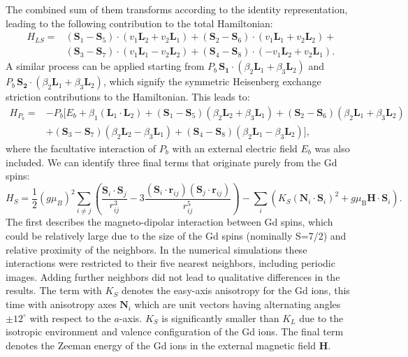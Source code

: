 The combined sum of them transforms according to the identity representation, leading to the following contribution to the total Hamiltonian:
\begin{align}
    H_{LS} =& (\bm{S}_1 - \bm{S}_5) \cdot (v_1 \bm{L}_2 + v_2 \bm{L}_1) + (\bm{S}_2 - \bm{S}_6) \cdot (v_1 \bm{L}_1 + v_2 \bm{L}_2) + \nonumber \\ &(\bm{S}_3 - \bm{S}_7) \cdot (v_1 \bm{L}_1 - v_2 \bm{L}_2) + (\bm{S}_4 - \bm{S}_8) \cdot (-v_1 \bm{L}_2 + v_2 \bm{L}_1).
\end{align}
A similar process can be applied starting from $P_b \, \bm{S_1}\cdot(\beta_2 \bm{L}_1 + \beta_3 \bm{L}_2)$ and $P_b\, \bm{S_2}\cdot(\beta_2 \bm{L}_1 + \beta_3 \bm{L}_2)$, which signify the symmetric Heisenberg exchange striction contributions to the Hamiltonian. This leads to:
\begin{align}
	H_{P_b}=&-P_b[E_b + \beta_1 (\bm{L}_1\cdot \bm{L}_2)+
    (\bm{S}_1-\bm{S}_5)(\beta_2 \bm{L}_2 + \beta_3 \bm{L}_1) +
    (\bm{S}_2-\bm{S}_6)(\beta_2 \bm{L}_1 + \beta_3 \bm{L}_2) \nonumber\\ 
    &+(\bm{S}_3-\bm{S}_7)(\beta_2 \bm{L}_2 - \beta_3 \bm{L}_1) +
    (\bm{S}_4-\bm{S}_8)(\beta_2 \bm{L}_1 - \beta_3 \bm{L}_2)],
\end{align}
where the facultative interaction of $P_b$ with an external electric field $E_b$ was also included. 
We can identify three final terms that originate purely from the Gd spins:
\begin{equation}
     H_S=\frac{1}{2}(g \mu_B)^2\sum_{i\neq j}\left(\frac{\bm{S}_i\cdot \bm{S}_j}{r_{ij}^3}-3\frac{(\bm{S}_i\cdot \bm{r}_{ij})(\bm{S}_j\cdot \bm{r}_{ij})}{r_{ij}^5}\right) - \sum_i\left( K_S(\bm{N}_i\cdot \bm{S}_i)^2 + g\mu_\mathrm{B} \bm{H} \cdot \bm{S}_i\right). 
\end{equation}
The first describes the magneto-dipolar interaction between Gd spins, which could be relatively large due to the size of the Gd spins (nominally S=7/2) and relative proximity of the neighbors.
In the numerical simulations these interactions were restricted to their five nearest neighbors, including periodic images.
Adding further neighbors did not lead to qualitative differences in the results.
The term with $K_S$ denotes the easy-axis anisotropy for the Gd ions, this time with anisotropy axes $\bm{N}_i$ which are unit vectors having alternating angles $\pm 12^\circ$ with respect to the $a$-axis.
$K_S$ is significantly smaller than $K_L$ due to the isotropic environment and valence configuration of the Gd ions.
The final term denotes the Zeeman energy of the Gd ions in the external magnetic field $\bm{H}$.
